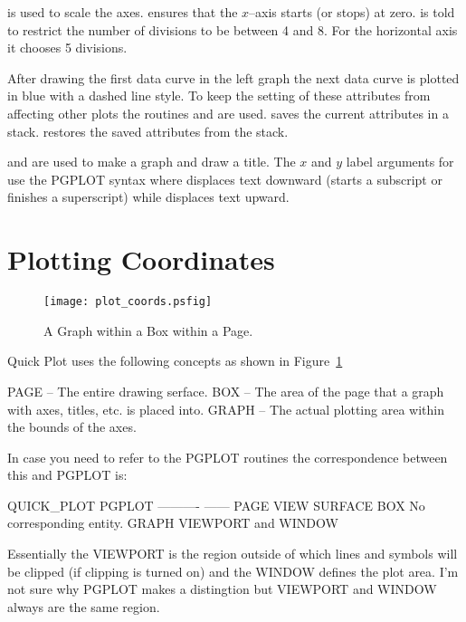  is used to scale the axes. 
ensures that the $x$--axis starts (or stops) at zero.
 is told to restrict the number of divisions to
be between 4 and 8. For the horizontal axis it chooses 5 divisions.

After drawing the first data curve in the left graph the next data curve is
plotted in blue with a dashed line style. To keep the setting of these
attributes from affecting other plots the routines   and
 are used.  saves the current attributes
in a stack.  restores the saved attributes from the stack.

 and  are used to make a
graph and draw a title. The $x$ and $y$ label arguments for
 use the PGPLOT syntax where \vn{\\d} displaces text
downward (starts a subscript or finishes a superscript) while \vn{\\u}
displaces text upward.

\section{Plotting Coordinates}
\label{s:plot_coords}

\begin{figure}
  \centering
  \texttt{[image: plot\_coords.psfig]}
  \caption{A Graph within a Box within a Page.}
  \label{f:plot_coords}
\end{figure}

Quick Plot uses the following concepts as shown in Figure~\ref{f:plot_coords}
\begin{example}
  PAGE  -- The entire drawing serface.
  BOX   -- The area of the page that a graph with axes, titles, etc. is placed into.
  GRAPH -- The actual plotting area within the bounds of the axes.
\end{example}
In case you need to refer to the PGPLOT routines the correspondence between this and PGPLOT is:
\begin{example}
  QUICK_PLOT    PGPLOT
  ----------    ------
  PAGE          VIEW SURFACE
  BOX           No corresponding entity.
  GRAPH         VIEWPORT and WINDOW
\end{example}
Essentially the VIEWPORT is the region outside of which lines and symbols
will be clipped (if clipping is turned on) and the WINDOW defines the
plot area. I'm not sure why PGPLOT makes a distingtion but VIEWPORT and
WINDOW always are the same region.


